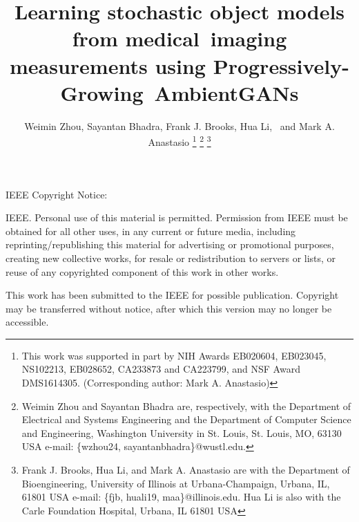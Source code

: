 \documentclass[journal]{IEEEtran}
\begin{document}
\thispagestyle{empty}
\onecolumn
\begin{Large}IEEE Copyright Notice:\end{Large}

\vspace{1cm}
 IEEE. Personal use of this material is permitted. Permission from IEEE must be obtained for all other uses, in any current or future media, including reprinting/republishing this material for advertising or promotional purposes, creating new collective works, for resale or redistribution to servers or lists, or reuse of any copyrighted component of this work in other works.

\vspace{1cm}
This work has been submitted to the IEEE for possible publication. Copyright may be transferred without notice, after which this version may no longer be accessible.

\newpage

\twocolumn
\setcounter{page}{1}

\title{Learning stochastic object models from medical~imaging measurements using Progressively-Growing~AmbientGANs}

\author{Weimin Zhou,
        Sayantan Bhadra,
        Frank J. Brooks, %
        Hua Li,~%
        and Mark A. Anastasio
        \thanks{
This work was supported in part by NIH Awards EB020604, EB023045, NS102213, EB028652, CA233873 and CA223799, and NSF Award DMS1614305. (Corresponding author: Mark A. Anastasio)}
\thanks{Weimin Zhou and Sayantan Bhadra are, respectively, with the Department 
of Electrical and Systems Engineering and the Department 
of Computer Science and Engineering, Washington University in St. Louis, St. Louis,
MO, 63130 USA e-mail: \{wzhou24, sayantanbhadra\}@wustl.edu.}%
\thanks{Frank J. Brooks, Hua Li, and Mark A. Anastasio are with the Department 
of Bioengineering, University of Illinois at Urbana-Champaign, Urbana,
IL, 61801 USA e-mail: \{fjb, huali19, maa\}@illinois.edu. Hua Li is also with the Carle Foundation Hospital, Urbana, IL 61801 USA}
\vspace{-0.6cm}
}
\maketitle
\end{document}
